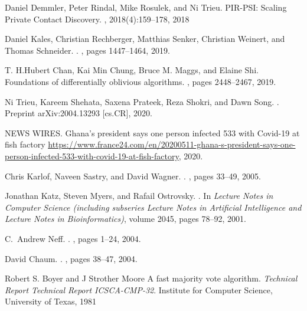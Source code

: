 \documentclass[11pt]{article}  %
\begin{document}
\begin{thebibliography}{10}
\begin{small}
 Daniel Demmler, Peter Rindal, Mike Rosulek, and
Ni Trieu. \newblock PIR-PSI: Scaling Private Contact Discovery.
, 2018(4):159–178, 2018

Daniel Kales, Christian Rechberger, Matthias Senker, Christian Weinert, and
  Thomas Schneider.
.
, pages
  1447--1464, 2019.
  
   T. H.Hubert Chan, Kai Min Chung, Bruce M. Maggs, and Elaine Shi. \newblock  Foundations of differentially oblivious algorithms. , pages 2448–2467, 2019.

Ni Trieu, Kareem Shehata, Saxena Prateek, Reza Shokri, and Dawn Song.
.
\newblock  Preprint arXiv:2004.13293 [cs.CR], 2020.

NEWS WIRES.
\newblock Ghana's president says one person infected 533 with Covid-19 at fish factory
\newblock
  \url{https://www.france24.com/en/20200511-ghana-s-president-says-one-person-infected-533-with-covid-19-at-fish-factory},
  2020.


Chris Karlof, Naveen Sastry, and David Wagner.
.
, pages 33--49, 2005.

Jonathan Katz, Steven Myers, and Rafail Ostrovsky.
.
\newblock In {\em Lecture Notes in Computer Science (including subseries
  Lecture Notes in Artificial Intelligence and Lecture Notes in
  Bioinformatics)}, volume 2045, pages 78--92, 2001.

C.~Andrew Neff.
.
, pages 1--24, 2004.

David Chaum.
.
, pages 38--47, 2004.

 Robert S. Boyer and J Strother Moore \newblock A fast majority vote algorithm. {\em Technical Report Technical Report ICSCA-CMP-32}. \newblock Institute for Computer Science, University of Texas, 1981


\end{small}
\end{thebibliography}
\end{document}
